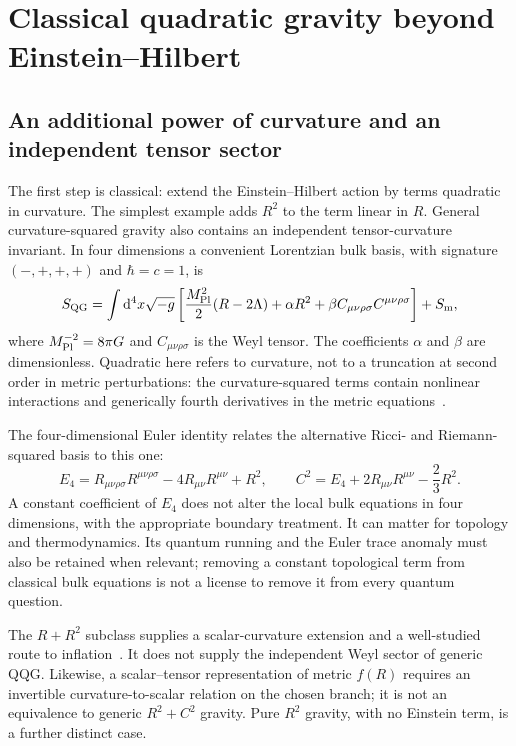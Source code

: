 \section{Classical quadratic gravity beyond Einstein--Hilbert}
\label{sec:classical-gravity}

\subsection{An additional power of curvature and an independent tensor sector}

The first step is classical: extend the Einstein--Hilbert action by terms quadratic in curvature.  The simplest example adds $R^2$ to the term linear in $R$.  General curvature-squared gravity also contains an independent tensor-curvature invariant.  In four dimensions a convenient Lorentzian bulk basis, with signature $(-,+,+,+)$ and $\hbar=c=1$, is
\begin{equation}
 S_{\rm QG}=\int\dd^4x\sqrt{-g}\left[
 \frac{M_{\rm Pl}^2}{2}(R-2\Lambda)+\alpha R^2
 +\beta C_{\mu\nu\rho\sigma}C^{\mu\nu\rho\sigma}\right]+S_{\rm m},
 \label{eq:qg-cosmological-action}
\end{equation}
where $M_{\rm Pl}^{-2}=8\pi G$ and $C_{\mu\nu\rho\sigma}$ is the Weyl tensor.  The coefficients $\alpha$ and $\beta$ are dimensionless.  Quadratic here refers to curvature, not to a truncation at second order in metric perturbations: the curvature-squared terms contain nonlinear interactions and generically fourth derivatives in the metric equations~\cite{Stelle:1978,Salvio:2018}.

The four-dimensional Euler identity relates the alternative Ricci- and Riemann-squared basis to this one:
\begin{equation}
 E_4=R_{\mu\nu\rho\sigma}R^{\mu\nu\rho\sigma}
 -4R_{\mu\nu}R^{\mu\nu}+R^2,
 \qquad C^2=E_4+2R_{\mu\nu}R^{\mu\nu}-\frac23R^2.
 \label{eq:quadratic-basis}
\end{equation}
A constant coefficient of $E_4$ does not alter the local bulk equations in four dimensions, with the appropriate boundary treatment.  It can matter for topology and thermodynamics.  Its quantum running and the Euler trace anomaly must also be retained when relevant; removing a constant topological term from classical bulk equations is not a license to remove it from every quantum question.

The $R+R^2$ subclass supplies a scalar-curvature extension and a well-studied route to inflation~\cite{Starobinsky:1980,DeFeliceTsujikawa:2010}.  It does not supply the independent Weyl sector of generic QQG.  Likewise, a scalar--tensor representation of metric $f(R)$ requires an invertible curvature-to-scalar relation on the chosen branch; it is not an equivalence to generic $R^2+C^2$ gravity.  Pure $R^2$ gravity, with no Einstein term, is a further distinct case.

